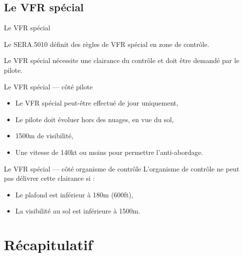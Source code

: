 \documentclass{beamer}
\begin{document}
\subsection{Le VFR spécial}

\begin{frame}{Le VFR spécial}

  Le SERA.5010 définit des règles de VFR spécial en zone de contrôle.
  \pause

  Le VFR spécial nécessite une clairance du contrôle et doit être
  demandé par le pilote.

\end{frame}
  
\begin{frame}{Le VFR spécial — côté pilote}

  \begin{itemize}
    \item Le VFR spécial peut-être effectué de jour uniquement, \pause
    \item Le pilote doit évoluer hors des nuages, en vue du sol, \pause
    \item 1500m de visibilité, \pause
    \item Une vitesse de 140kt ou moins pour permettre l'anti-abordage.
  \end{itemize}

\end{frame}
  
\begin{frame}{Le VFR spécial — côté organisme de contrôle}
  L'organisme de contrôle ne peut pas délivrer cette clairance si :
  \pause
  
  \begin{itemize}
    \item Le plafond est inférieur à 180m (600ft), \pause
    \item La visibilité au sol est inférieure à 1500m.
  \end{itemize}

\end{frame}

\section{Récapitulatif}
\end{document}
